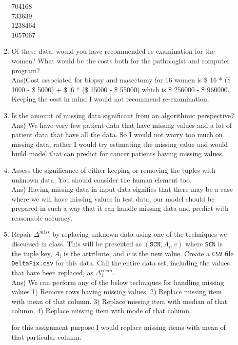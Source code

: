 \documentclass{article}
\begin{document}
\begin{enumerate}
\begin{enumerate}
704168 \\
733639 \\
1238464 \\
1057067 \\
 \item Of these data, would you have recommended re-examination for the women?  What would be the costs both for the pathologist and computer program? \\
Ans)Cost associated for biopsy and masectomy for 16 women is \$ 16 * (\$ 1000 - \$ 5000) + \$16 * (\$ 15000 - \$ 55000) which is \$ 256000 - \$ 960000. Keeping the cost in mind I would not recommend re-examination.
  \item Is the amount of missing data significant from an algorithmic perspective? \\ 
  Ans) We have very few patient data that have missing values and a lot of patient data that have all the data. So I would not worry too much on missing data, rather I would try estimating the missing value and would build model that can predict for cancer patients having missing values.
  \item Assess the significance of either keeping or removing the tuples with unknown data. You should consider the human element too. \\
Ans) Having missing data in input data signifies that there may be a case where we will have missing values in test data, our model should be prepared in such a way that it can handle missing data and predict with reasonable accuracy. 
  
 \item Repair $\Delta^{miss}$ by replacing unknown data using one of the techniques we discussed in class.  This will be  presented as $(\texttt{SCN}, A_i, v)$ where \texttt{SCN} is the tuple key, $A_i$ is the attribute, and $v$ is the new value.
 Create a \texttt{CSV} file \texttt{DeltaFix.csv} for this data.  Call the entire data set, including the values that have been replaced, as $\Delta_1^{clean}$. \\
Ans) We can perform any of the below techniques for handling missing values
 1) Remove rows having missing values.
 2) Replace missing item with mean of that column.
 3) Replace missing item with median of that column.
 4) Replace missing item with mode of that column.
 
 for this assignment purpose I would replace missing items with mean of that particular column.
 \end{enumerate} 
 

\end{enumerate}
\end{document}
